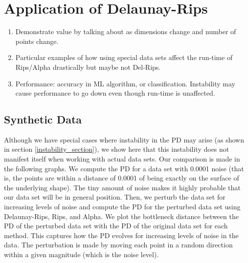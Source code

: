 \documentclass[letterpaper,titlepage]{article}
\begin{document}
    
\section{Application of Delaunay-Rips}
\begin{enumerate}
    \item Demonstrate value by talking about as dimensions change and number of points change.
    \item Particular examples of how using special data sets affect the run-time of Rips/Alpha drastically but maybe not Del-Rips.
    \item Performance: accuracy in ML algorithm, or classification. Instability may cause performance to go down even though run-time is unaffected.
\end{enumerate}

\subsection{Synthetic Data}

    Although we have special cases where instability in the PD may arise (as shown in section \ref{instability_section}), we show here that this instability does not manifest itself when working with actual data sets. Our comparison is made in the following graphs. We compute the PD for a data set with 0.0001 noise (that is, the points are within a distance of 0.0001 of being exactly on the surface of the underlying shape). The tiny amount of noise makes it highly probable that our data set will be in general position. Then, we perturb the data set for increasing levels of noise and compute the PD for the perturbed data set using Delaunay-Rips, Rips, and Alpha. We plot the bottleneck distance between the PD of the perturbed data set with the PD of the original data set for each method. This captures how the PD evolves for increasing levels of noise in the data. The perturbation is made by moving each point in a random direction within a given magnitude (which is the noise level).


\end{document}
